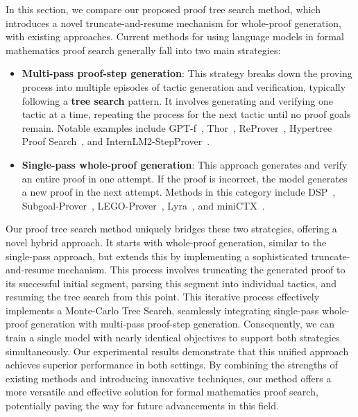 In this section, we compare our proposed proof tree search method, which introduces a novel truncate-and-resume mechanism for whole-proof generation, with existing approaches. Current methods for using language models in formal mathematics proof search generally fall into two main strategies:
\begin{itemize}
    \item \textbf{Multi-pass proof-step generation}: This strategy breaks down the proving process into multiple episodes of tactic generation and verification, typically following a \textbf{tree search} pattern. It involves generating and verifying one tactic at a time, repeating the process for the next tactic until no proof goals remain. Notable examples include GPT-f~\citep{polu2020generative, polu2022formal}, Thor~\citep{jiang2022thor}, ReProver~\citep{yang2024leandojo}, Hypertree Proof Search~\citep{lample2022hypertree}, and InternLM2-StepProver~\citep{wu2024lean}.
    \item \textbf{Single-pass whole-proof generation}: This approach generates and verify an entire proof in one attempt. If the proof is incorrect, the model generates a new proof in the next attempt. Methods in this category include DSP~\citep{jiang2022draft}, Subgoal-Prover~\cite{zhao2023decomposing}, LEGO-Prover~\citep{wang2023lego}, Lyra~\citep{zheng2023lyra}, and miniCTX~\citep{hu2024minictx}.
\end{itemize}
Our proof tree search method uniquely bridges these two strategies, offering a novel hybrid approach. It starts with whole-proof generation, similar to the single-pass approach, but extends this by implementing a sophisticated truncate-and-resume mechanism. This process involves truncating the generated proof to its successful initial segment, parsing this segment into individual tactics, and resuming the tree search from this point. This iterative process effectively implements a Monte-Carlo Tree Search, seamlessly integrating single-pass whole-proof generation with multi-pass proof-step generation. Consequently, we can train a single model with nearly identical objectives to support both strategies simultaneously. Our experimental results demonstrate that this unified approach achieves superior performance in both settings. By combining the strengths of existing methods and introducing innovative techniques, our method offers a more versatile and effective solution for formal mathematics proof search, potentially paving the way for future advancements in this field.
